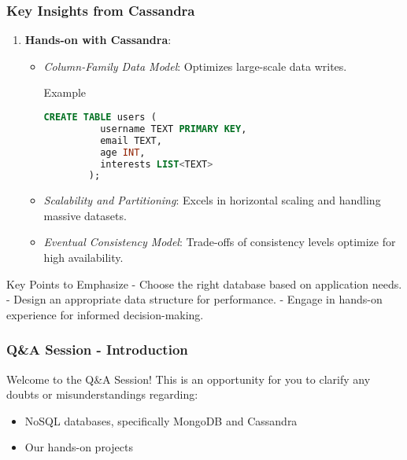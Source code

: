 \documentclass[aspectratio=169]{beamer}
\begin{document}
\begin{frame}[fragile]
  \frametitle{Key Insights from Cassandra}
  \begin{enumerate}
    \item \textbf{Hands-on with Cassandra}:
      \begin{itemize}
        \item \textit{Column-Family Data Model}: Optimizes large-scale data writes.
        \begin{block}{Example}
        \begin{lstlisting}[language=sql]
        CREATE TABLE users (
          username TEXT PRIMARY KEY,
          email TEXT,
          age INT,
          interests LIST<TEXT>
        );
        \end{lstlisting}
        \end{block}
        
        \item \textit{Scalability and Partitioning}: Excels in horizontal scaling and handling massive datasets.
        
        \item \textit{Eventual Consistency Model}: Trade-offs of consistency levels optimize for high availability.
      \end{itemize}
  \end{enumerate}

  \begin{block}{Key Points to Emphasize}
    - Choose the right database based on application needs.
    - Design an appropriate data structure for performance.
    - Engage in hands-on experience for informed decision-making.
  \end{block}
\end{frame}

\begin{frame}[fragile]
    \frametitle{Q\&A Session - Introduction}
    Welcome to the Q\&A Session! This is an opportunity for you to clarify any doubts or misunderstandings regarding:
    \begin{itemize}
        \item NoSQL databases, specifically MongoDB and Cassandra
        \item Our hands-on projects
    \end{itemize}
\end{frame}
\end{document}

